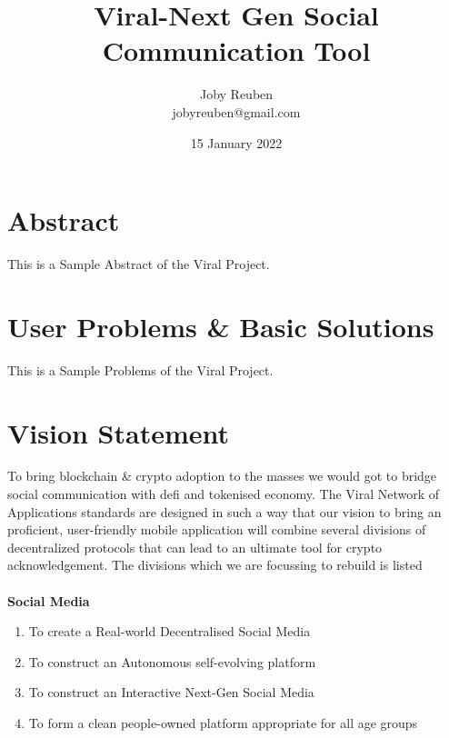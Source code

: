 \documentclass[12pt]{article}
\title{Viral-Next Gen Social Communication Tool}
\date{15 January 2022}
\author{Joby Reuben\\jobyreuben@gmail.com}
\begin{document}
\maketitle

\section{Abstract}
This is a Sample Abstract of the Viral Project.

\section{User Problems \& Basic Solutions}
This is a Sample Problems of the Viral Project.

\section{Vision Statement}
To bring blockchain \& crypto adoption to the masses we would got to bridge social communication with defi and tokenised economy. The Viral Network of Applications standards are designed in such a way that our vision to bring an proficient, user-friendly mobile application will combine several divisions of decentralized protocols that can lead to an ultimate tool for crypto acknowledgement. The divisions which we are focussing to rebuild is listed\\
\\
\textbf{\large Social Media}
\begin{enumerate}
\item To create a Real-world Decentralised Social Media
\item To construct an Autonomous self-evolving platform
\item To construct an Interactive Next-Gen Social Media
\item To form a clean people-owned platform appropriate for all age groups
\end{enumerate}
\end{document}
